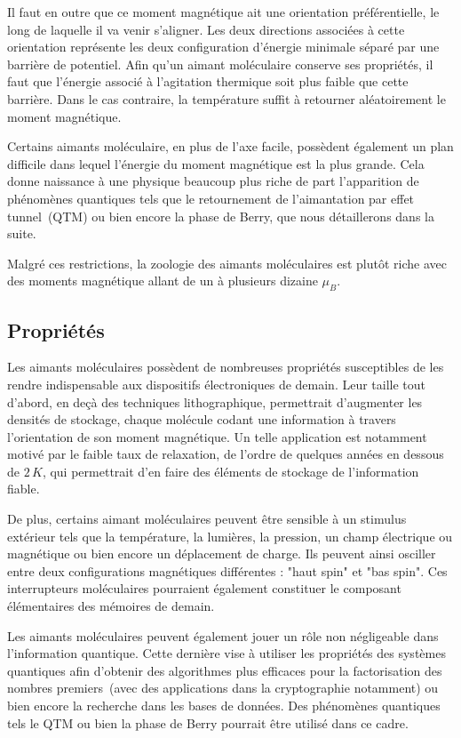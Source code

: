 Il faut en outre que ce moment magnétique ait une orientation préférentielle, le long de laquelle il va venir s'aligner. Les deux directions associées à cette orientation représente les deux configuration d'énergie minimale séparé par une barrière de potentiel. Afin qu'un aimant moléculaire conserve ses propriétés, il faut que l'énergie associé à l'agitation thermique soit plus faible que cette barrière. Dans le cas contraire, la température suffit à retourner aléatoirement le moment magnétique.

Certains aimants moléculaire, en plus de l'axe facile, possèdent également un plan difficile dans lequel l'énergie du moment magnétique est la plus grande. Cela donne naissance à une physique beaucoup plus riche de part l'apparition de phénomènes quantiques tels que le retournement de l'aimantation par effet tunnel~(QTM) ou bien encore la phase de Berry, que nous détaillerons dans la suite.

Malgré ces restrictions, la zoologie des aimants moléculaires est plutôt riche avec des moments magnétique allant de un à plusieurs dizaine $\mu_B$.


\subsection{Propriétés}
Les aimants moléculaires possèdent de nombreuses propriétés susceptibles de les rendre indispensable aux dispositifs électroniques de demain. Leur taille tout d'abord, en deçà des techniques lithographique, permettrait d'augmenter les densités de stockage, chaque molécule codant une information à travers l'orientation de son moment magnétique. Un telle application est notamment motivé par le faible taux de relaxation, de l'ordre de quelques années en dessous de $2\,K$, qui permettrait d'en faire des éléments de stockage de l'information fiable.

De plus, certains aimant moléculaires peuvent être sensible à un stimulus extérieur tels que la température, la lumières, la pression, un champ électrique ou magnétique ou bien encore un déplacement de charge. Ils peuvent ainsi osciller entre deux configurations magnétiques différentes : "haut spin" et "bas spin". Ces interrupteurs moléculaires pourraient également constituer le composant élémentaires des mémoires de demain.

Les aimants moléculaires peuvent également jouer un rôle non négligeable dans l'information quantique. Cette dernière vise à utiliser les propriétés des systèmes quantiques afin d'obtenir des algorithmes plus efficaces pour la factorisation des nombres premiers~(avec des applications dans la cryptographie notamment) ou bien encore la recherche dans les bases de données. Des phénomènes quantiques tels le QTM ou bien la phase de Berry pourrait être utilisé dans ce cadre.

